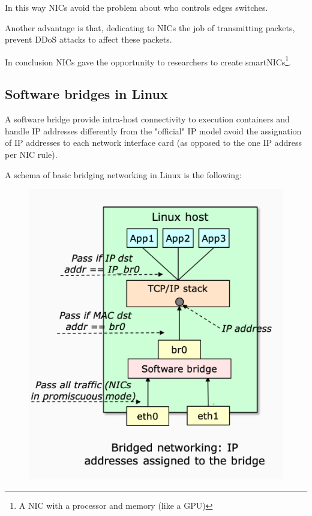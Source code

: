             In this way NICs avoid the problem about who controls edges switches.
            
            Another advantage is that, dedicating to NICs the job of transmitting packets, prevent DDoS attacks to affect these packets.
            
            In conclusion NICs gave the opportunity to researchers to  create smartNICs\footnote{A NIC with a processor and memory (like a GPU)}.
            

    \subsection{Software bridges in Linux}
        A software bridge provide intra-host connectivity to execution containers and handle IP addresses differently from the "official" IP model avoid the assignation of IP addresses to each network interface card (as opposed to the one IP address per NIC rule).
        
        \FloatBarrier
        A schema of basic bridging networking in Linux is the following:
        \begin{figure}[h!]
            \centering
            \includegraphics[scale=0.25]{images/bridgeschema.png}
        \end{figure}
        \FloatBarrier
        
